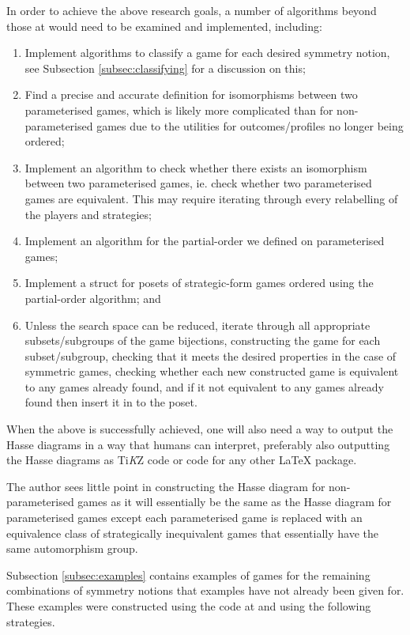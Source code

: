 	In order to achieve the above research goals, a number of algorithms beyond those at \cite{GLCode} would need to be examined and implemented, including:
	\begin{enumerate}
		\item Implement algorithms to classify a game for each desired symmetry notion, see Subsection \ref{subsec:classifying} for a discussion on this;
		\item Find a precise and accurate definition for isomorphisms between two parameterised games, which is likely more complicated than for non-parameterised games due to the utilities for outcomes/profiles no longer being ordered;
		\item Implement an algorithm to check whether there exists an isomorphism between two parameterised games, ie. check whether two parameterised games are equivalent. This may require iterating through every relabelling of the players and strategies;
		\item Implement an algorithm for the partial-order we defined on parameterised games;
		\item Implement a struct for posets of strategic-form games ordered using the partial-order algorithm; and
		\item Unless the search space can be reduced, iterate through all appropriate subsets/subgroups of the game bijections, constructing the game for each subset/subgroup, checking that it meets the desired properties in the case of symmetric games, checking whether each new constructed game is equivalent to any games already found, and if it not equivalent to any games already found then insert it in to the poset. 
	\end{enumerate}
	
	When the above is successfully achieved, one will also need a way to output the Hasse diagrams in a way that humans can interpret, preferably also outputting the Hasse diagrams as Ti\emph{K}Z code or code for any other {\LaTeX} package.
	
	The author sees little point in constructing the Hasse diagram for non-parameterised games as it will essentially be the same as the Hasse diagram for parameterised games except each parameterised game is replaced with an equivalence class of strategically inequivalent games that essentially have the same automorphism group.
	
	Subsection \ref{subsec:examples} contains examples of games for the remaining combinations of symmetry notions that examples have not already been given for. These examples were constructed using the code at \cite{GLCode} and using the following strategies.
    

